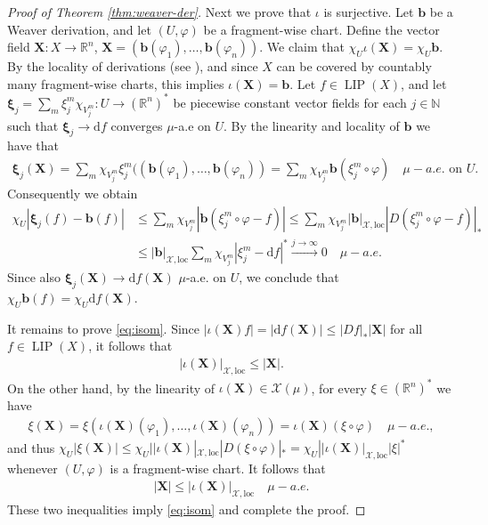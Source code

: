 \documentclass{amsart}
\numberwithin{equation}{section}
\newcommand{\R}{\mathbb{R}}
\newcommand{\N}{\mathbb{N}}
\newcommand{\LIP}{\operatorname{LIP}}
\newcommand{\ud}{\mathrm {d}}
\newcommand{\loc}{\mathrm{loc}}
\begin{document}
\begin{proof}[Proof of Theorem \ref{thm:weaver-der}]
Next we prove that $\iota$ is surjective. Let $\bm b$ be a Weaver derivation, and let $(U,\varphi)$ be a fragment-wise chart. Define the vector field $\bm X:X\to \R^n$, $\bm X=(\bm b(\varphi_1),\ldots,\bm b(\varphi_n))$. We claim that $\chi_U\iota(\bm X)=\chi_U\bm b$. By the locality of derivations (see \cite[Lemma 2.120]{sch16}), and since $X$ can be covered by countably many fragment-wise charts, this implies $\iota(\bm X)=\bm b$. Let $f\in\LIP(X)$, and let $\displaystyle \bm \xi_j=\sum_m\xi_j^m\chi_{V_j^m}:U\to (\R^n)^*$ be piecewise constant vector fields for each $j\in\N$ such that $\bm\xi_j\to \ud f$ converges $\mu$-a.e on $U$. By the linearity and locality of $\bm b$ we have that
\begin{align*}
\bm \xi_j(\bm X)=\sum_m\chi_{V_j^m}\xi_j^m((\bm b(\varphi_1),\ldots,\bm b(\varphi_n))=\sum_m\chi_{V_j^m}\bm b(\xi_j^m\circ\varphi)\quad \mu-a.e.\textrm{ on }U.
\end{align*}
Consequently we obtain 
\begin{align*}
	\chi_U|\bm\xi_j(f)-\bm b(f)|&\le \sum_m\chi_{V_j^m}|\bm b(\xi_j^m\circ\varphi-f)|\le \sum_m\chi_{V_j^m}|\bm b|_{\mathcal X, \loc}|D(\xi_j^m\circ\varphi-f)|_\ast\\
	&\le |\bm b|_{\mathcal X, \loc}\sum_m\chi_{V_j^m}|\xi_j^m-\ud f|^*\stackrel{j\to\infty}{\longrightarrow} 0\quad \mu-a.e.
\end{align*}
Since also $\bm\xi_j(\bm X)\to \ud f(\bm X)$ $\mu$-a.e. on $U$, we conclude that $\chi_U\bm b(f)=\chi_U\ud f(\bm X)$. 

It remains to prove \eqref{eq:isom}. Since $|\iota(\bm X)f|=|\ud f(\bm X)|\le |D f|_*|\bm X|$ for all $f\in \LIP(X)$, it follows that
\begin{align*}\label{eq:iota-bd-1}
	|\iota(\bm X)|_{\mathcal X, \loc}\le |\bm X|.
\end{align*}
On the other hand, by the linearity of $\iota(\bm X)\in \mathcal X(\mu)$, for every $\xi\in (\R^n)^*$ we have
\begin{align*}
	\xi(\bm X)=\xi(\iota(\bm X)(\varphi_1),\ldots,\iota(\bm X)(\varphi_n))=\iota(\bm X)(\xi\circ\varphi)\quad \mu-a.e.,
\end{align*}
and thus $\chi_U|\xi(\bm X)|\le \chi_U||\iota(\bm X)|_{\mathcal X,\loc}|D(\xi\circ\varphi)|_\ast=\chi_U||\iota(\bm X)|_{\mathcal X,\loc}|\xi|^*$ whenever $(U,\varphi)$ is a fragment-wise chart. It follows that
\begin{align*}
	|\bm X|\le |\iota(\bm X)|_{\mathcal X,\loc}\quad\mu-a.e.
\end{align*}
These two inequalities imply \eqref{eq:isom} and complete the proof.
\end{proof}
\end{document}
